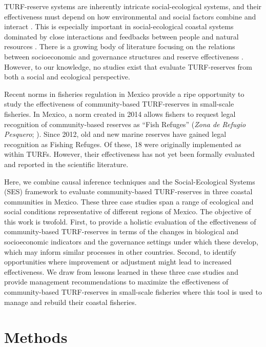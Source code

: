 \documentclass{frontiersSCNS}
\begin{document}
TURF-reserve systems are inherently intricate social-ecological systems,
and their effectiveness must depend on how environmental and social
factors combine and interact \citep{gelcich_2015}. This is especially
important in social-ecological coastal systems dominated by close
interactions and feedbacks between people and natural resources
\citep{ostrom_2009}. There is a growing body of literature focusing on
the relations between socioeconomic and governance structures and
reserve effectiveness
\citep{halpern_2013,lpezangarita_2014,mascia_2017-m_,bergseth_2018}.
However, to our knowledge, no studies exist that evaluate TURF-reserves
from both a social and ecological perspective.

Recent norms in fisheries regulation in Mexico provide a ripe
opportunity to study the effectiveness of community-based TURF-reserves
in small-scale fisheries. In Mexico, a norm created in 2014 allows
fishers to request legal recognition of community-based reserves as
``Fish Refuges'' (\emph{Zona de Refugio Pesquero}; \citet{nom}). Since
2012, old and new marine reserves have gained legal recognition as
Fishing Refuges. Of these, 18 were originally implemented as within
TURFs. However, their effectiveness has not yet been formally evaluated
and reported in the scientific literature.

Here, we combine causal inference techniques and the Social-Ecological
Systems (SES) framework to evaluate community-based TURF-reserves in
three coastal communities in Mexico. These three case studies span a
range of ecological and social conditions representative of different
regions of Mexico. The objective of this work is twofold. First, to
provide a holistic evaluation of the effectiveness of community-based
TURF-reserves in terms of the changes in biological and socioeconomic
indicators and the governance settings under which these develop, which
may inform similar processes in other countries. Second, to identify
opportunities where improvement or adjustment might lead to increased
effectiveness. We draw from lessons learned in these three case studies
and provide management recommendations to maximize the effectiveness of
community-based TURF-reserves in small-scale fisheries where this tool
is used to manage and rebuild their coastal fisheries.

\hypertarget{methods}{%
\section{Methods}\label{methods}}
\end{document}

